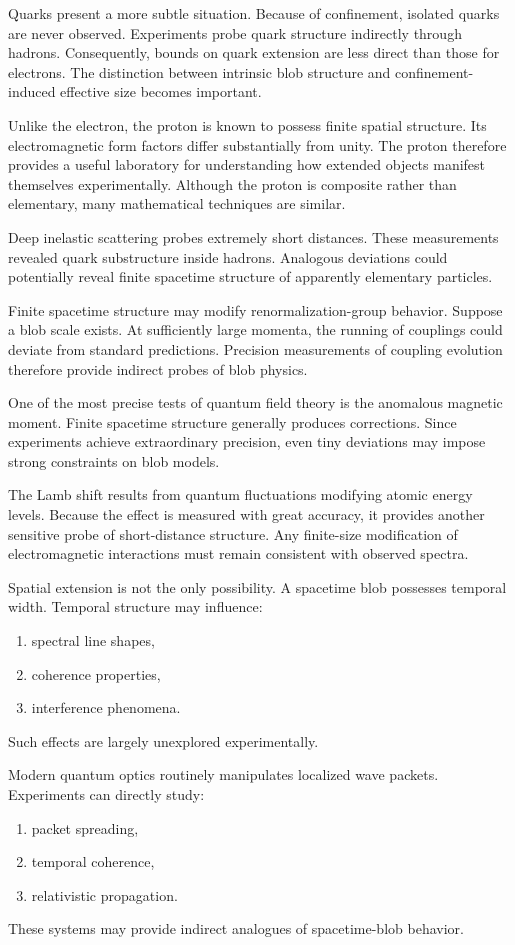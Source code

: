 Quarks present a more subtle situation.
Because of confinement, isolated quarks are never observed.
Experiments probe quark structure indirectly through hadrons.
Consequently, bounds on quark extension are less direct than those for electrons.
The distinction between intrinsic blob structure and confinement-induced effective size becomes important.

Unlike the electron, the proton is known to possess finite spatial structure.
Its electromagnetic form factors differ substantially from unity.
The proton therefore provides a useful laboratory for understanding 
how extended objects manifest themselves experimentally.
Although the proton is composite rather than elementary, many mathematical
techniques are similar.

Deep inelastic scattering probes extremely short distances.
These measurements revealed quark substructure inside hadrons.
Analogous deviations could potentially reveal finite spacetime structure of
apparently elementary particles.

Finite spacetime structure may modify renormalization-group behavior.
Suppose a blob scale exists.
At sufficiently large momenta,
the running of couplings could deviate from standard predictions.
Precision measurements of coupling evolution therefore provide indirect
probes of blob physics.

One of the most precise tests of quantum field theory is the anomalous
magnetic moment.
Finite spacetime structure generally produces corrections.
Since experiments achieve extraordinary precision, even tiny deviations may
impose strong constraints on blob models.

The Lamb shift results from quantum fluctuations modifying atomic energy levels.
Because the effect is measured with great accuracy, it provides another
sensitive probe of short-distance structure.
Any finite-size modification of electromagnetic interactions must remain
consistent with observed spectra.

Spatial extension is not the only possibility.
A spacetime blob possesses temporal width.
Temporal structure may influence:
\begin{enumerate}
\item spectral line shapes,
\item coherence properties,
\item interference phenomena.
\end{enumerate}
Such effects are largely unexplored experimentally.

Modern quantum optics routinely manipulates localized wave packets.
Experiments can directly study:
\begin{enumerate}
\item packet spreading,
\item temporal coherence,
\item relativistic propagation.
\end{enumerate}
These systems may provide indirect analogues of spacetime-blob behavior.

